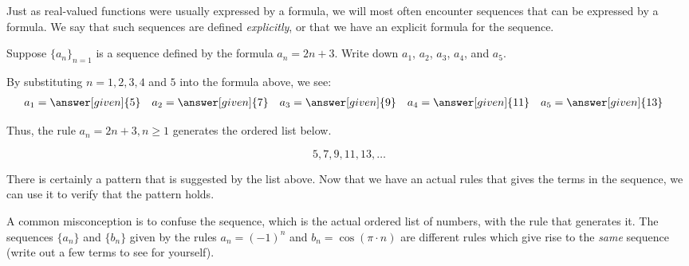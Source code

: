 \documentclass{ximera}
\begin{document}
Just as real-valued functions were usually expressed by a formula, we
will most often encounter sequences that can be expressed by a
formula.  We say that such sequences are defined \textit{explicitly}, 
or that we have an explicit formula for the sequence.

\begin{example}
Suppose $\{a_n\}_{n=1}$ is a sequence defined by the formula $a_n = 2n+3$.  Write down $a_1$, $a_2$, $a_3$, $a_4$, and $a_5$.

  \begin{explanation}
    By substituting $n=1, 2, 3, 4$ and $5$ into the formula above, we see:
    \begin{align*}
      a_1 &= \answer[given]{5} & 
      a_2 &= \answer[given]{7} & 
      a_3 &= \answer[given]{9} & 
      a_4 &= \answer[given]{11} & 
      a_5 &= \answer[given]{13} 
    \end{align*}
    
Thus, the rule $a_n = 2n+3, n \geq 1$ generates the ordered list below.

\[
5,7,9,11,13, \dots
\]   

There is certainly a pattern that is suggested by the list above. Now that we have an actual rules that gives the terms in the sequence, we can use it to verify that the pattern holds.

  \end{explanation}
  
\end{example}

\begin{warning}
  A common misconception is to confuse the sequence, which is the
  actual ordered list of numbers, with the rule that generates it.
  The sequences $\{a_n\}$ and $\{b_n\}$ given by the rules $a_n =
  (-1)^n$ and $b_n = \cos (\pi \cdot n)$ are different rules which give rise to the \textit{same} sequence (write
  out a few terms to see for yourself).  
  \end{warning}



%
%  
\end{document}
